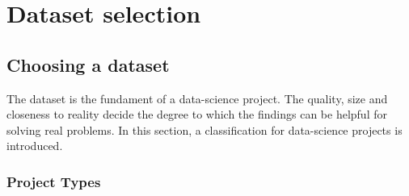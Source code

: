 \chapter{Dataset selection}
\section{Choosing a dataset}
	The dataset is the fundament of a data-science project. The quality, size and closeness to reality decide the degree to which the findings can be helpful for solving real problems. 
	In this section, a classification for data-science projects is introduced.
	
	\subsection{Project Types}
